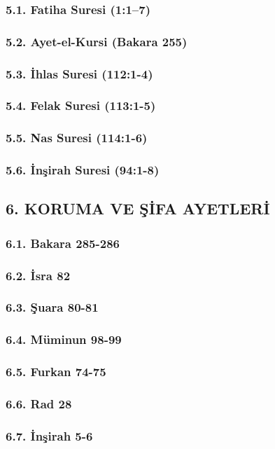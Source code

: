 \documentclass[12pt,a4paper]{article}
\begin{document}
\subsubsection{5.1. Fatiha Suresi (1:1–7)}
\subsubsection{5.2. Ayet-el-Kursi (Bakara 255)}
\subsubsection{5.3. İhlas Suresi (112:1-4)}
\subsubsection{5.4. Felak Suresi (113:1-5)}
\subsubsection{5.5. Nas Suresi (114:1-6)}
\subsubsection{5.6. İnşirah Suresi (94:1-8)}
\subsection{6. KORUMA VE ŞİFA AYETLERİ}
\subsubsection{6.1. Bakara 285-286}
\subsubsection{6.2. İsra 82}
\subsubsection{6.3. Şuara 80-81}
\subsubsection{6.4. Müminun 98-99}
\subsubsection{6.5. Furkan 74-75}
\subsubsection{6.6. Rad 28}
\subsubsection{6.7. İnşirah 5-6}
\end{document}

